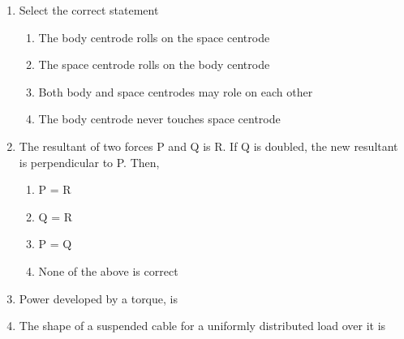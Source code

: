 \documentclass[11pt,a4paper]{article}
\begin{document}
\begin{enumerate}
{The correct answer is
}
\begin{enumerate}[label=\Alph*.]
\item{only (i)}
\item{both (i) and (ii)}
\item{both (i) and (iii)}
\item{all (i), (ii) and (iii)}
\end{enumerate}
\item{Select the correct statement}
\begin{enumerate}[label=\Alph*.]
\item{The body centrode rolls on the space centrode}
\item{The space centrode rolls on the body centrode}
\item{Both body and space centrodes may role on each other}
\item{The body centrode never touches space centrode}
\end{enumerate}
\item{The resultant of two forces P and Q is R. If Q is doubled, the new resultant is perpendicular to P. Then,}
\begin{enumerate}[label=\Alph*.]
\item{P = R}
\item{Q = R}
\item{P = Q}
\item{None of the above is correct}
\end{enumerate}
\item{Power developed by a torque, is}
\\
\item{The shape of a suspended cable for a uniformly distributed load over it is}
\\
\end{enumerate}
\end{document}
